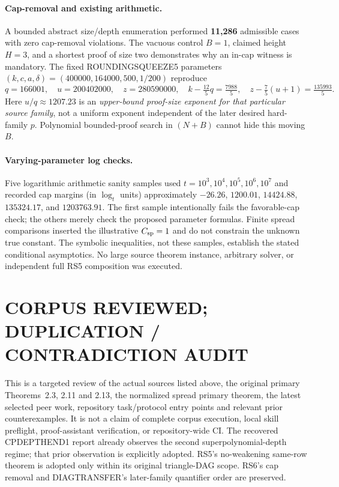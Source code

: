 \documentclass[11pt]{article}
\begin{document}
\paragraph{Cap-removal and existing arithmetic.}
A bounded abstract size/depth enumeration performed
\textbf{11,286} admissible cases with zero cap-removal violations.
The vacuous control $B=1$, claimed height $H=3$, and a shortest
proof of size two demonstrates why an in-cap witness is mandatory.
The fixed ROUNDINGSQUEEZE5 parameters
$(k,c,a,\delta)=(400000,164000,500,1/200)$ reproduce
\[
q=166001,\quad u=200402000,\quad z=280590000,
\quad k-\tfrac{12}{5}q=\tfrac{7988}{5},\quad
z-\tfrac75(u+1)=\tfrac{135993}{5}.
\]
Here $u/q\approx1207.23$ is an \emph{upper-bound proof-size
exponent for that particular source family}, not a uniform
exponent independent of the later desired hard-family $p$.
Polynomial bounded-proof search in $(N+B)$ cannot hide this
moving $B$.

\paragraph{Varying-parameter log checks.}
Five logarithmic arithmetic sanity samples used
$t=10^3,10^4,10^5,10^6,10^7$ and recorded cap
margins (in $\log_t$ units) approximately
$-26.26$, $1200.01$, $14424.88$, $135324.17$,
and $1203763.91$. The first sample intentionally
fails the favorable-cap check; the others merely
check the proposed parameter formulas. Finite
spread comparisons inserted the illustrative
$C_{\rm sp}=1$ and do not constrain the unknown
true constant. The symbolic inequalities, not these
samples, establish the stated conditional asymptotics.
No large source theorem instance, arbitrary solver,
or independent full RS5 composition was executed.

\section{CORPUS REVIEWED; DUPLICATION / CONTRADICTION AUDIT}
This is a targeted review of the actual sources listed above,
the original primary Theorems~2.3, 2.11 and 2.13, the
normalized spread primary theorem, the latest selected peer
work, repository task/protocol entry points and relevant
prior counterexamples. It is not a claim of complete corpus
execution, local skill preflight, proof-assistant verification,
or repository-wide CI. The recovered CPDEPTHEND1 report
already observes the second superpolynomial-depth regime;
that prior observation is explicitly adopted. RS5's
no-weakening same-row theorem is adopted only within
its original triangle-DAG scope. RS6's cap removal and
DIAGTRANSFER's later-family quantifier order are preserved.
\end{document}
